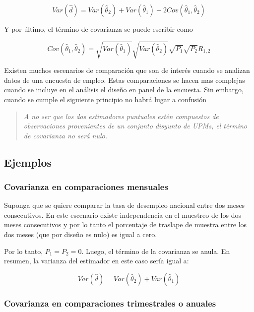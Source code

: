 \[
Var(\hat{d}) 
= Var(\hat{\theta}_2) + Var(\hat{\theta}_1) - 2 Cov(\hat{\theta}_1, \hat{\theta}_2) 
\]

Y por último, el término de covarianza se puede escribir como

\[
Cov(\hat{\theta}_1, \hat{\theta}_2) = \sqrt{Var(\hat{\theta}_1)}\sqrt{Var(\hat{\theta}_2)}\sqrt{P_1}\sqrt{P_2}R_{1,2}
\]

Existen muchos escenarios de comparación que son de interés cuando se analizan datos de una encuesta de empleo. Estas comparaciones se hacen mas complejas cuando se incluye en el análisis el diseño en panel de la encuesta. Sin embargo, cuando se cumple el siguiente principio no habrá lugar a confusión

\begin{quote}
\emph{A no ser que los dos estimadores puntuales estén compuestos de observaciones provenientes de un conjunto disyunto de UPMs, el término de covarianza no será nulo.}
\end{quote}

\hypertarget{ejemplos}{%
\subsection{Ejemplos}\label{ejemplos}}

\hypertarget{covarianza-en-comparaciones-mensuales}{%
\subsubsection*{Covarianza en comparaciones mensuales}\label{covarianza-en-comparaciones-mensuales}}


Suponga que se quiere comparar la tasa de desempleo nacional entre dos meses consecutivos. En este escenario existe independencia en el muestreo de los dos meses consecutivos y por lo tanto el porcentaje de traslape de muestra entre los dos meses (que por diseño es nulo) es igual a cero.

Por lo tanto, \(P_1 = P_2 = 0\). Luego, el término de la covarianza se anula. En resumen, la varianza del estimador en este caso sería igual a:

\[
Var(\hat{d}) 
= Var(\hat{\theta}_2) + Var(\hat{\theta}_1)
\]

\hypertarget{covarianza-en-comparaciones-trimestrales-o-anuales}{%
\subsubsection*{Covarianza en comparaciones trimestrales o anuales}\label{covarianza-en-comparaciones-trimestrales-o-anuales}}


